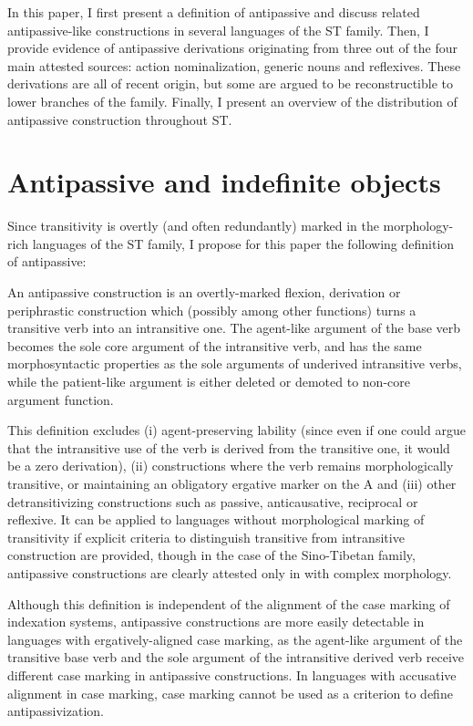 \documentclass[oneside,a4paper,11pt]{article}
\begin{document}
In this paper, I first present a definition of antipassive and discuss related antipassive-like constructions in several languages of the ST family. Then, I provide evidence of antipassive derivations originating from three out of the four main attested sources: action nominalization, generic nouns and reflexives. These derivations are all of recent origin, but some are argued to be reconstructible to lower branches of the family. Finally, I present an overview of the distribution of antipassive construction throughout ST.

\section{Antipassive and indefinite objects}
Since transitivity is overtly (and often redundantly) marked in the morphology-rich languages of the ST family, I propose for this paper the following definition of antipassive:

\begin{exe}
\ex \label{ex:def}
\glt An antipassive construction is an overtly-marked flexion, derivation or periphrastic construction which (possibly among other functions) turns a transitive verb into an intransitive one. The agent-like argument of the base verb becomes the sole core argument of the intransitive verb, and has the same morphosyntactic properties as the sole arguments of underived intransitive verbs, while the patient-like argument is either deleted or demoted to non-core argument function.
\end{exe}

This definition excludes  (i) agent-preserving lability (since even if one could argue that the intransitive use of the verb is derived from the transitive one, it would be a zero derivation), (ii) constructions where the verb remains morphologically transitive, or maintaining an obligatory ergative marker on the A and (iii) other detransitivizing constructions such as passive, anticausative, reciprocal or reflexive. It can be applied to languages without morphological marking of transitivity if explicit criteria to distinguish transitive from intransitive construction are provided, though in the case of the Sino-Tibetan family, antipassive constructions are clearly attested only in with complex morphology. 

Although this definition is independent of the alignment of the case marking of indexation systems, antipassive constructions are more easily detectable in languages with ergatively-aligned case marking, as the agent-like argument of the transitive base verb and the sole argument of the intransitive derived verb receive different case marking in antipassive constructions. In languages with accusative alignment in case marking, case marking cannot be used as a criterion to define antipassivization.
\end{document}
